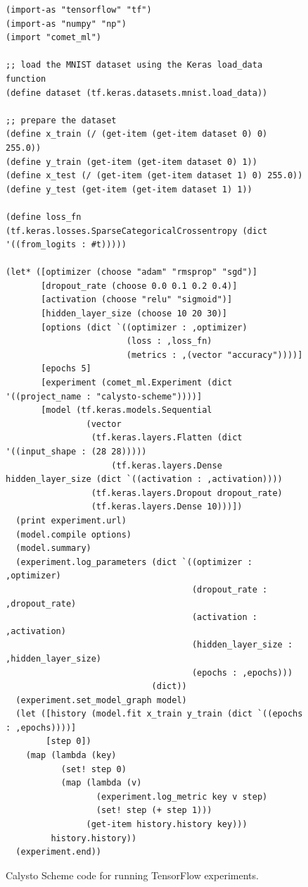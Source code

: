 \documentclass[acmsmall,screen,nonacm]{acmart}
\begin{document}
\begin{figure}[h]
\begin{minipage}{0.8\textwidth}
{\scriptsize
\begin{verbatim}
(import-as "tensorflow" "tf")
(import-as "numpy" "np")
(import "comet_ml")

;; load the MNIST dataset using the Keras load_data function
(define dataset (tf.keras.datasets.mnist.load_data))

;; prepare the dataset
(define x_train (/ (get-item (get-item dataset 0) 0) 255.0))
(define y_train (get-item (get-item dataset 0) 1))
(define x_test (/ (get-item (get-item dataset 1) 0) 255.0))
(define y_test (get-item (get-item dataset 1) 1))

(define loss_fn (tf.keras.losses.SparseCategoricalCrossentropy (dict '((from_logits : #t)))))

(let* ([optimizer (choose "adam" "rmsprop" "sgd")]
       [dropout_rate (choose 0.0 0.1 0.2 0.4)]
       [activation (choose "relu" "sigmoid")]
       [hidden_layer_size (choose 10 20 30)]
       [options (dict `((optimizer : ,optimizer)
                        (loss : ,loss_fn)
                        (metrics : ,(vector "accuracy"))))]
       [epochs 5]
       [experiment (comet_ml.Experiment (dict '((project_name : "calysto-scheme"))))]
       [model (tf.keras.models.Sequential 
                (vector
                 (tf.keras.layers.Flatten (dict '((input_shape : (28 28)))))
                     (tf.keras.layers.Dense hidden_layer_size (dict `((activation : ,activation))))
                 (tf.keras.layers.Dropout dropout_rate)
                 (tf.keras.layers.Dense 10)))])
  (print experiment.url)
  (model.compile options)
  (model.summary)
  (experiment.log_parameters (dict `((optimizer : ,optimizer)
                                     (dropout_rate : ,dropout_rate)
                                     (activation : ,activation)
                                     (hidden_layer_size : ,hidden_layer_size)
                                     (epochs : ,epochs)))
                             (dict))
  (experiment.set_model_graph model)
  (let ([history (model.fit x_train y_train (dict `((epochs : ,epochs))))]
        [step 0])
    (map (lambda (key)
           (set! step 0)
           (map (lambda (v)
                  (experiment.log_metric key v step)
                  (set! step (+ step 1)))
                (get-item history.history key)))
         history.history))
  (experiment.end))
\end{verbatim}
}
\end{minipage}
\caption{Calysto Scheme code for running TensorFlow experiments.}
\label{fig:tensorflow}
\end{figure}
\end{document}
